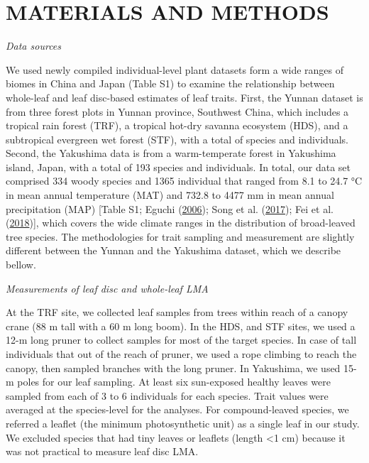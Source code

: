\documentclass[
  12pt,
  a4paper,
,tablecaptionabove
]{scrartcl}
\begin{document}
\hypertarget{materials-and-methods}{%
\section{MATERIALS AND METHODS}\label{materials-and-methods}}

\emph{Data sources}

We used newly compiled individual-level plant datasets form a wide ranges of biomes in China and Japan (Table S1) to examine the relationship between whole-leaf and leaf disc-based estimates of leaf traits.
First, the Yunnan dataset is from three forest plots in Yunnan province, Southwest China, which includes a tropical rain forest (TRF), a tropical hot-dry savanna ecosystem (HDS), and a subtropical evergreen wet forest (STF), with a total of species and individuals.
Second, the Yakushima data is from a warm-temperate forest in Yakushima island, Japan, with a total of 193 species and individuals.
In total, our data set comprised 334 woody species and 1365 individual that ranged from 8.1 to 24.7 °C in mean annual temperature (MAT) and 732.8 to 4477 mm in mean annual precipitation (MAP) {[}Table S1; Eguchi (\protect\hyperlink{ref-Eguchi2006}{2006}); Song et al. (\protect\hyperlink{ref-Song2017}{2017}); Fei et al. (\protect\hyperlink{ref-Fei2018}{2018}){]}, which covers the wide climate ranges in the distribution of broad-leaved tree species.
The methodologies for trait sampling and measurement are slightly different between the Yunnan and the Yakushima dataset, which we describe bellow.

\emph{Measurements of leaf disc and whole-leaf LMA}

At the TRF site, we collected leaf samples from trees within reach of a canopy crane (88 m tall with a 60 m long boom).
In the HDS, and STF sites, we used a 12-m long pruner to collect samples for most of the target species.
In case of tall individuals that out of the reach of pruner, we used a rope climbing to reach the canopy, then sampled branches with the long pruner.
In Yakushima, we used 15-m poles for our leaf sampling.
At least six sun-exposed healthy leaves were sampled from each of 3 to 6 individuals for each species.
Trait values were averaged at the species-level for the analyses.
For compound-leaved species, we referred a leaflet (the minimum photosynthetic unit) as a single leaf in our study.
We excluded species that had tiny leaves or leaflets (length \textless1 cm) because it was not practical to measure leaf disc LMA.
\end{document}
